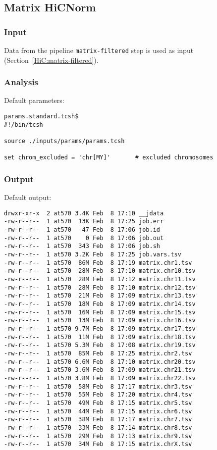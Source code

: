 \subsection{Matrix HiCNorm}\label{HiC:matrix-hicnorm}%
\subsubsection{Input} %
Data from the pipeline \texttt{matrix-filtered} step is used as input (Section~\ref{HiC:matrix-filtered}).
\subsubsection{Analysis} %
Default parameters:
\begin{lstlisting}
params.standard.tcsh$
#!/bin/tcsh

source ./inputs/params/params.tcsh

set chrom_excluded = 'chr[MY]'       # excluded chromosomes

\end{lstlisting}
\subsubsection{Output} %
Default output: %
\begin{lstlisting}
drwxr-xr-x  2 at570 3.4K Feb  8 17:10 __jdata
-rw-r--r--  1 at570  13K Feb  8 17:25 job.err
-rw-r--r--  1 at570   47 Feb  8 17:06 job.id
-rw-r--r--  1 at570    0 Feb  8 17:06 job.out
-rw-r--r--  1 at570  343 Feb  8 17:06 job.sh
-rw-r--r--  1 at570 3.2K Feb  8 17:25 job.vars.tsv
-rw-r--r--  1 at570  86M Feb  8 17:19 matrix.chr1.tsv
-rw-r--r--  1 at570  28M Feb  8 17:10 matrix.chr10.tsv
-rw-r--r--  1 at570  28M Feb  8 17:12 matrix.chr11.tsv
-rw-r--r--  1 at570  28M Feb  8 17:10 matrix.chr12.tsv
-rw-r--r--  1 at570  21M Feb  8 17:09 matrix.chr13.tsv
-rw-r--r--  1 at570  18M Feb  8 17:09 matrix.chr14.tsv
-rw-r--r--  1 at570  16M Feb  8 17:09 matrix.chr15.tsv
-rw-r--r--  1 at570  13M Feb  8 17:09 matrix.chr16.tsv
-rw-r--r--  1 at570 9.7M Feb  8 17:09 matrix.chr17.tsv
-rw-r--r--  1 at570  11M Feb  8 17:09 matrix.chr18.tsv
-rw-r--r--  1 at570 5.3M Feb  8 17:08 matrix.chr19.tsv
-rw-r--r--  1 at570  85M Feb  8 17:25 matrix.chr2.tsv
-rw-r--r--  1 at570 6.6M Feb  8 17:10 matrix.chr20.tsv
-rw-r--r--  1 at570 3.6M Feb  8 17:09 matrix.chr21.tsv
-rw-r--r--  1 at570 3.8M Feb  8 17:09 matrix.chr22.tsv
-rw-r--r--  1 at570  58M Feb  8 17:17 matrix.chr3.tsv
-rw-r--r--  1 at570  55M Feb  8 17:20 matrix.chr4.tsv
-rw-r--r--  1 at570  49M Feb  8 17:15 matrix.chr5.tsv
-rw-r--r--  1 at570  44M Feb  8 17:15 matrix.chr6.tsv
-rw-r--r--  1 at570  38M Feb  8 17:17 matrix.chr7.tsv
-rw-r--r--  1 at570  33M Feb  8 17:14 matrix.chr8.tsv
-rw-r--r--  1 at570  29M Feb  8 17:13 matrix.chr9.tsv
-rw-r--r--  1 at570  34M Feb  8 17:15 matrix.chrX.tsv
\end{lstlisting}
\clearpage
